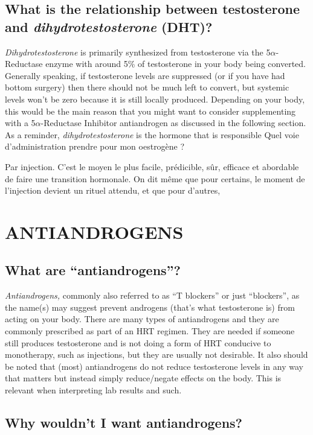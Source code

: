 \documentclass{article}
\begin{document}
\subsection{What is the relationship between testosterone and \textit{dihydrotestosterone} (DHT)?}

\textit{Dihydrotestosterone} is primarily synthesized from testosterone via the 5$\alpha$-Reductase enzyme with around 5\% of testosterone in your body being converted. Generally speaking, if testosterone levels are suppressed (or if you have had bottom surgery) then there should not be much left to convert, but systemic levels won’t be zero because it is still locally produced. Depending on your body, this would be the main reason that you might want to consider supplementing with a 5$\alpha$-Reductase Inhibitor antiandrogen as discussed in the following section. As a reminder, \textit{dihydrotestosterone }is the hormone that is responsible Quel voie d'administration prendre pour mon oestrogène ?

Par injection. C'est le moyen le plus facile, prédicible, sûr, efficace et abordable de faire une transition hormonale. On dit même que pour certains, le moment de l'injection devient un rituel attendu, et que pour d'autres,  
\section{ANTIANDROGENS}\label{AA}

\subsection{What are “antiandrogens”?}

\textit{Antiandrogens, }commonly also referred to as “T blockers” or just “blockers”, as the name(s) may suggest prevent androgens (that’s what testosterone is) from acting on your body. There are many types of antiandrogens and they are commonly prescribed as part of an HRT regimen. They are needed if someone still produces testosterone and is not doing a form of HRT conducive to monotherapy, such as injections, but they are usually not desirable. It also should be noted that (most) antiandrogens do not reduce testosterone levels in any way that matters but instead simply reduce/negate effects on the body. This is relevant when interpreting lab results and such.

\subsection{Why wouldn’t I want antiandrogens?}
\end{document}
